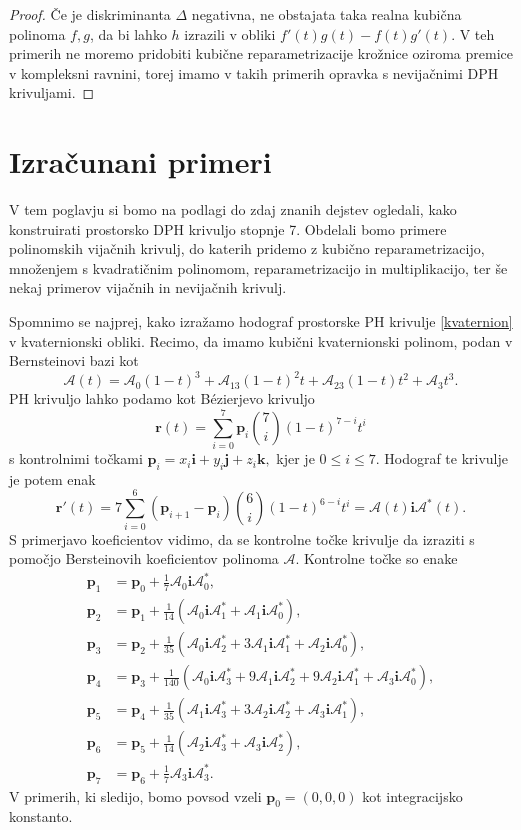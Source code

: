 \documentclass[12pt,a4paper,twoside]{article}
\theoremstyle{definition} %
\theoremstyle{plain} %
\theoremstyle{primerstyle}
\numberwithin{equation}{section}  %
\newcommand{\pV}{\mathbf{p}}
\newcommand{\rV}{\mathbf{r}}
\newcommand{\iV}{\mathbf{i}}
\newcommand{\jV}{\mathbf{j}}
\newcommand{\kV}{\mathbf{k}}
\newcommand{\AQ}{\mathcal{A}}
\begin{document}
\begin{proof}
	Če je diskriminanta $\Delta$ negativna, ne obstajata taka realna kubična polinoma $f,g$, da bi lahko $h$ izrazili v obliki $f'(t)g(t)-f(t)g'(t).$ V teh primerih ne moremo pridobiti kubične reparametrizacije krožnice oziroma premice v kompleksni ravnini, torej imamo v takih primerih opravka s nevijačnimi DPH krivuljami.
\end{proof}
\clearpage

\section{Izračunani primeri}

V tem poglavju si bomo na podlagi do zdaj znanih dejstev ogledali, kako konstruirati prostorsko DPH krivuljo stopnje 7. Obdelali bomo primere polinomskih vijačnih krivulj, do katerih pridemo z kubično reparametrizacijo, množenjem s kvadratičnim polinomom, reparametrizacijo in multiplikacijo, ter še nekaj primerov vijačnih in nevijačnih krivulj.

Spomnimo se najprej, kako izražamo hodograf prostorske PH krivulje \eqref{kvaternion} v kvaternionski obliki. Recimo, da imamo kubični kvaternionski polinom, podan v Bernsteinovi bazi kot
\begin{equation}
	\AQ(t)=\AQ_0(1-t)^3+\AQ_13(1-t)^2t+\AQ_23(1-t)t^2+\AQ_3t^3.
\end{equation}
PH krivuljo lahko podamo kot Bézierjevo krivuljo
\begin{equation*}
	\rV(t)=\sum_{i=0}^7\pV_i\binom{7}{i}(1-t)^{7-i}t^i
\end{equation*}
s kontrolnimi točkami $\pV_i=x_i\iV+y_i\jV+z_i\kV,$ kjer je $0\leq i\leq 7.$ Hodograf te krivulje je potem enak
\begin{equation*}
	\rV'(t)=7\sum_{i=0}^6(\pV_{i+1}-\pV_i)\binom{6}{i}(1-t)^{6-i}t^i=\AQ(t)\iV\AQ^*(t).
\end{equation*}
S primerjavo koeficientov vidimo, da se kontrolne točke krivulje da izraziti s pomočjo Bersteinovih koeficientov polinoma $\AQ.$ Kontrolne točke so enake
\begin{align}
	\pV_1&=\pV_0+\frac{1}{7}\AQ_0\iV\AQ_0^*,\nonumber\\
	\pV_2&=\pV_1+\frac{1}{14}(\AQ_0\iV\AQ_1^*+\AQ_1\iV\AQ_0^*),\nonumber\\
	\pV_3&=\pV_2+\frac{1}{35}(\AQ_0\iV\AQ_2^*+3\AQ_1\iV\AQ_1^*+\AQ_2\iV\AQ_0^*),\nonumber\\
	\pV_4&=\pV_3+\frac{1}{140}(\AQ_0\iV\AQ_3^*+9\AQ_1\iV\AQ_2^*+9\AQ_2\iV\AQ_1^*+\AQ_3\iV\AQ_0^*),\label{kontrolne_tocke}\\
	\pV_5&=\pV_4+\frac{1}{35}(\AQ_1\iV\AQ_3^*+3\AQ_2\iV\AQ_2^*+\AQ_3\iV\AQ_1^*),\nonumber\\
	\pV_6&=\pV_5+\frac{1}{14}(\AQ_2\iV\AQ_3^*+\AQ_3\iV\AQ_2^*),\nonumber\\
	\pV_7&=\pV_6+\frac{1}{7}\AQ_3\iV\AQ_3^*.\nonumber
\end{align}
V primerih, ki sledijo, bomo povsod vzeli $\pV_0=(0,0,0)$ kot integracijsko konstanto.
\end{document}
